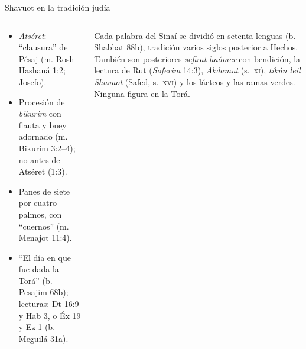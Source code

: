 \begin{frame}{Shavuot en la tradición judía}
\begin{columns}[t,onlytextwidth]
\begin{column}{0.49\textwidth}\small\RaggedRight
\begin{itemize}
\item {} \emph{Atséret}: ``clausura'' de Pésaj (m. Rosh Hashaná 1:2; Josefo).
\item Procesión de \emph{bikurim} con flauta y buey adornado (m. Bikurim 3:2--4); no antes de Atséret (1:3).
\item Panes de siete por cuatro palmos, con ``cuernos'' (m. Menajot 11:4).
\item ``El día en que fue dada la Torá'' (b. Pesajim 68b); lecturas: Dt 16:9 y Hab 3, o Éx 19 y Ez 1 (b. Meguilá 31a).
\end{itemize}
\end{column}
\begin{column}{0.49\textwidth}
\begin{tcolorbox}[colback=mostaza!10,colframe=mostaza!85!tierraroja,boxrule=0.6pt,arc=2pt,left=4pt,right=4pt,fonttitle=\bfseries\scriptsize,coltitle=caferojizo,colbacktitle=mostaza!30,title={Precisión: prácticas posteriores}]
\scriptsize\RaggedRight Cada palabra del Sinaí se dividió en setenta lenguas (b. Shabbat 88b), tradición varios siglos posterior a Hechos. También son posteriores \emph{sefirat haómer} con bendición, la lectura de Rut (\emph{Soferim} 14:3), \emph{Akdamut} (s.~\textsc{xi}), \emph{tikún leil Shavuot} (Safed, s.~\textsc{xvi}) y los lácteos y las ramas verdes. Ninguna figura en la Torá.
\end{tcolorbox}
\end{column}
\end{columns}
\end{frame}

